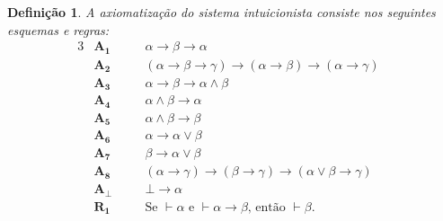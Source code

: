 \documentclass{report}
\newtheorem{definition}{Definição}
\begin{document}


        

    \begin{definition}
        A axiomatização do sistema intuicionista consiste nos seguintes esquemas e regras:
        \begin{alignat*}{3}
            & \mathbf{A_1}\quad && \alpha\to\beta\to\alpha \\
            & \mathbf{A_2}\quad && (\alpha\to\beta\to\gamma)\to(\alpha\to\beta)\to(\alpha\to\gamma) \\
            & \mathbf{A_3}\quad && \alpha\to\beta\to\alpha\wedge\beta \\
            & \mathbf{A_4}\quad && \alpha\wedge\beta\to\alpha \\
            & \mathbf{A_5}\quad && \alpha\wedge\beta\to\beta \\
            & \mathbf{A_6}\quad && \alpha\to\alpha\vee\beta \\
            & \mathbf{A_7}\quad && \beta\to\alpha\vee\beta \\
            & \mathbf{A_8}\quad && (\alpha\to\gamma)\to(\beta\to\gamma)\to(\alpha\vee\beta\to\gamma) \\
            & \mathbf{A_\bot}\quad && \bot\to\alpha \\
            & \mathbf{R_1}\quad && \text{Se }\vdash\alpha\text{ e }\vdash\alpha\to\beta\text{, então }\vdash\beta\text{.} & \tag*{\qed}
        \end{alignat*}   
    \end{definition}
\end{document}
